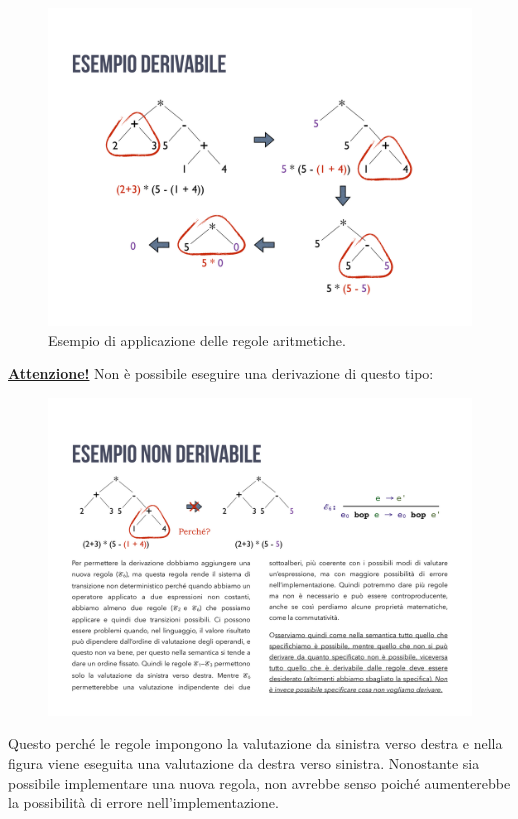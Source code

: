 \documentclass[a4paper]{article}
\begin{document}
	\begin{figure}[!htp]
		\centering
		\includegraphics[width=\textwidth]{img/esempio_regole_aritmetiche.pdf}
		\caption{Esempio di applicazione delle regole aritmetiche.}
	\end{figure}
	
	\noindent
	\underline{\textbf{Attenzione!}} Non è possibile eseguire una derivazione di questo tipo:
	\begin{figure}[!htp]
		\centering
		\includegraphics[width=\textwidth]{img/esempio_regole_errato.pdf}
	\end{figure}
	
	\noindent
	Questo perché le regole impongono la valutazione da sinistra verso destra e nella figura viene eseguita una valutazione da destra verso sinistra. Nonostante sia possibile implementare una nuova regola, non avrebbe senso poiché aumenterebbe la possibilità di errore nell'implementazione.
	
\end{document}

